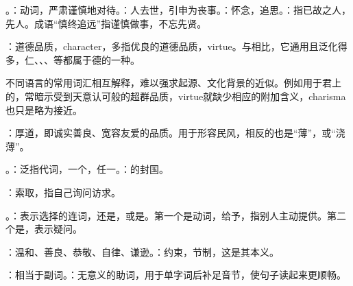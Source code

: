 {
\item {}。：动词，严肃谨慎地对待。：人去世，引申为丧事。：怀念，追思。：指已故之人，先人。成语“慎终追远”指谨慎做事，不忘先贤。
\item {}：道德品质，character，多指优良的道德品质，virtue。与相比，它通用且泛化得多，仁、、、等都属于德的一种。

不同语言的常用词汇相互解释，难以强求起源、文化背景的近似。例如用于君上的，常暗示受到天意认可般的超群品质，virtue就缺少相应的附加含义，charisma也只是略为接近。
\item {}：厚道，即诚实善良、宽容友爱的品质。用于形容民风，相反的也是“薄”，或“浇薄”。
}
{}  %


{
\item {}。：泛指代词，一个，任一。：的封国。
\item {}：索取，指自己询问访求。
\item {}。：表示选择的连词，还是，或是。第一个是动词，给予，指别人主动提供。第二个是，表示疑问。
\item {}：温和、善良、恭敬、自律、谦逊。：约束，节制，这是其本义。
\item {}：相当于副词。：无意义的助词，用于单字词后补足音节，使句子读起来更顺畅。
}
{}


